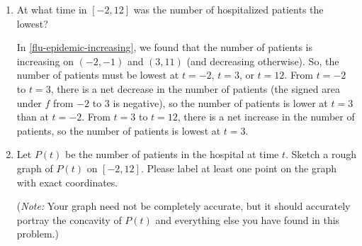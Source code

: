 \documentclass{article}
\begin{document}
\begin{enumerate}
    \begin{enumerate}[resume]

    \item
      \begin{problem}[1in]
        At what time in $[-2, 12]$ was the number of hospitalized patients
        the lowest?  
      \end{problem}

      \begin{solution}
        In \ref{flu-epidemic-increasing}, we found that the number of
        patients is increasing on $(-2, -1)$ and $(3, 11)$ (and decreasing
        otherwise).  So, the number of patients must be lowest at $t = -2$,
        $t = 3$, or $t = 12$.  From $t = -2$ to $t = 3$, there is a net
        decrease in the number of patients (the signed area under $f$ from
        $-2$ to $3$ is negative), so the number of patients is lower at $t =
        3$ than at $t = -2$.  From $t = 3$ to $t = 12$, there is a net
        increase in the number of patients, so the number of patients is
        lowest at $\boxed{t = 3}$.
      \end{solution}

    \item 
      \begin{problem}
        Let $P(t)$ be the number of patients in the hospital at time $t$.
        Sketch a rough graph of $P(t)$ on $[-2, 12]$.  Please label at least
        one point on the graph with exact coordinates. 

        (\emph{Note:} Your graph need not be completely accurate, but it
        should accurately portray the concavity of $P(t)$ and everything
        else you have found in this problem.)      
      \end{problem}


\end{enumerate}
\end{enumerate}
\end{document}
